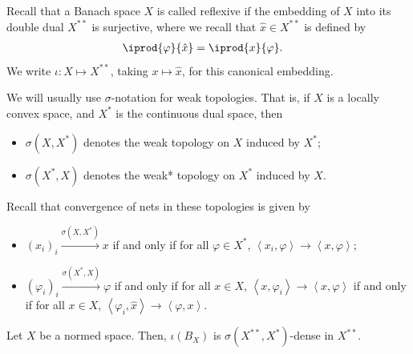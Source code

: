\documentclass[10pt]{mypackage}
\begin{document}
Recall that a Banach space $X$ is called reflexive if the embedding of $X$ into its double dual $X^{\ast\ast}$ is surjective, where we recall that $\hat{x}\in X^{\ast\ast}$ is defined by
\begin{align*}
  \iprod{\varphi}{\hat{x}} &= \iprod{x}{\varphi}.
\end{align*}
We write $\iota\colon X\mapsto X^{\ast\ast}$, taking $x\mapsto \hat{x}$, for this canonical embedding.

We will usually use $\sigma$-notation for weak topologies. That is, if $X$ is a locally convex space, and $X^{\ast}$ is the continuous dual space, then
\begin{itemize}
  \item $\sigma\left( X,X^{\ast} \right)$ denotes the weak topology on $X$ induced by $X^{\ast}$;
  \item $\sigma\left( X^{\ast},X \right)$ denotes the weak* topology on $X^{\ast}$ induced by $X$.
\end{itemize}
Recall that convergence of nets in these topologies is given by
\begin{itemize}
  \item $\left( x_i \right)_i\xrightarrow{\sigma\left( X,X^{\ast} \right)}x$ if and only if for all $\varphi\in X^{\ast}$, $ \left\langle x_i,\varphi \right\rangle\rightarrow \left\langle x,\varphi \right\rangle $;
  \item $\left( \varphi_i \right)_i\xrightarrow{\sigma\left( X^{\ast},X \right)} \varphi$ if and only if for all $x\in X$, $ \left\langle x,\varphi_i \right\rangle\rightarrow \left\langle x,\varphi \right\rangle $ if and only if for all $x\in X$, $ \left\langle \varphi_i,\hat{x} \right\rangle\rightarrow \left\langle \varphi,x \right\rangle $.
\end{itemize}
\begin{theorem}
  Let $X$ be a normed space. Then, $\iota\left( B_X \right)$ is $\sigma\left( X^{\ast\ast},X^{\ast} \right)$-dense in $X^{\ast\ast}$.
\end{theorem}
\end{document}
